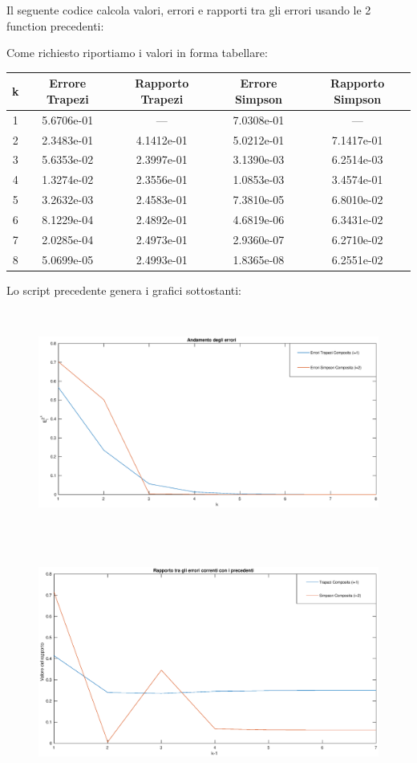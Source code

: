 \begin{flushleft}
Il seguente codice calcola valori, errori e rapporti tra gli errori usando le 2 function precedenti:

Come richiesto riportiamo i valori in forma tabellare:
\begin{center}
\begin{tabular}{|c|c|c|c|c|}
\hline
k & Errore Trapezi & Rapporto Trapezi & Errore Simpson & Rapporto Simpson \\
\hline
1 &  5.6706e-01 &  --- & 7.0308e-01 & --- \\
2 &  2.3483e-01 &  4.1412e-01 & 5.0212e-01 & 7.1417e-01 \\
3 &  5.6353e-02 &  2.3997e-01 & 3.1390e-03 & 6.2514e-03 \\
4 &  1.3274e-02 &  2.3556e-01 & 1.0853e-03 & 3.4574e-01 \\
5 &  3.2632e-03 &  2.4583e-01 & 7.3810e-05 & 6.8010e-02 \\
6 &  8.1229e-04 &  2.4892e-01 & 4.6819e-06 & 6.3431e-02 \\
7 &  2.0285e-04 &  2.4973e-01 & 2.9360e-07 & 6.2710e-02 \\
8 &  5.0699e-05 &  2.4993e-01 & 1.8365e-08 & 6.2551e-02 \\
\hline
\end{tabular}
\end{center}
Lo script precedente genera i grafici sottostanti:
\begin{figure}[H]
\includegraphics[width=480px, height=280px]{plot/fes52b}
\end{figure}
\begin{figure}[H]
\includegraphics[width=480px, height=280px]{plot/fes52c}
\end{figure}
\end{flushleft}